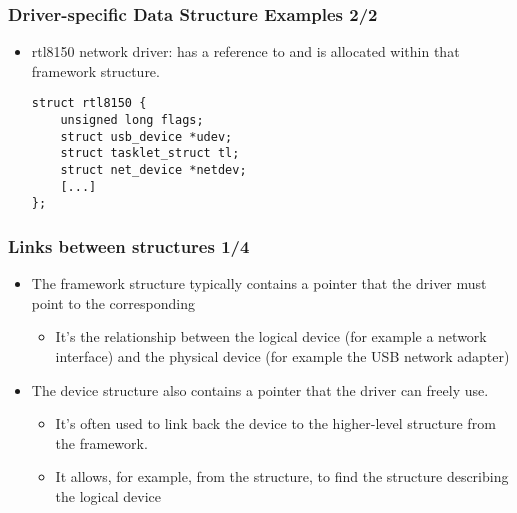 \begin{frame}[fragile]
  \frametitle{Driver-specific Data Structure Examples 2/2}
  \begin{itemize}
  \item rtl8150 network driver:  has a reference to
     and is allocated within that framework structure.
  \begin{verbatim}
struct rtl8150 {
    unsigned long flags;
    struct usb_device *udev;
    struct tasklet_struct tl;
    struct net_device *netdev;
    [...]
};
  \end{verbatim}
  \end{itemize}
\end{frame}

\begin{frame}
  \frametitle{Links between structures 1/4}
  \begin{itemize}
  \item The framework structure typically contains a  \code{*}
    pointer that the driver must point to the corresponding
    \begin{itemize}
    \item It's the relationship between the logical device (for example a
      network interface) and the physical device (for example the USB
      network adapter)
    \end{itemize}
  \item The device structure also contains a  pointer
    that the driver can freely use.
    \begin{itemize}
    \item It's often used to link back the device to the higher-level
      structure from the framework.
    \item It allows, for example, from the 
      structure, to find the structure describing the logical device
    \end{itemize}
  \end{itemize}
\end{frame}

